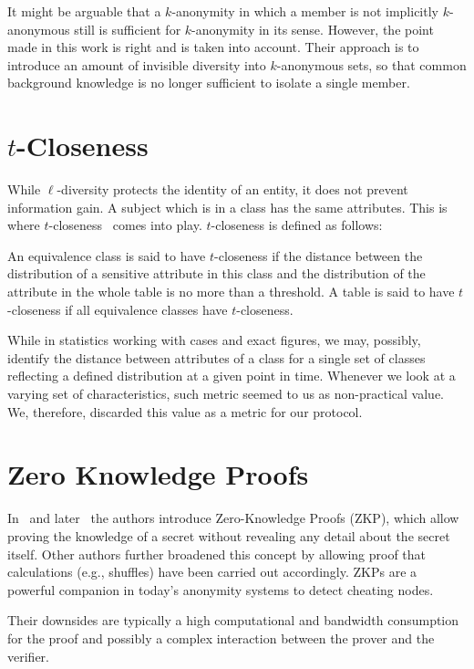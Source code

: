It might be arguable that a $k$-anonymity in which a member is not implicitly $k$-anonymous still is sufficient for $k$-anonymity in its sense. However, the point made in this work is right and is taken into account. Their approach is to introduce an amount of invisible diversity into $k$-anonymous sets, so that common background knowledge is no longer sufficient to isolate a single member.

\section{\texorpdfstring{$t$}{t}-Closeness}
While $\ell$-diversity protects the identity of an entity, it does not prevent information gain. A subject which is in a class has the same attributes. This is where $t$-closeness~\cite{li2007t} comes into play. $t$-closeness is defined as follows:

\begin{shadequote}{}
	An equivalence class is said to have $t$-closeness if the distance between the distribution of a sensitive attribute in this class and the distribution of the attribute in the whole table is no more than a threshold. A table is said to have $t$-closeness if all equivalence classes have $t$-closeness.
\end{shadequote}

While in statistics working with cases and exact figures, we may, possibly, identify the distance between attributes of a class for a single set of classes reflecting a defined distribution at a given point in time. Whenever we look at a varying set of characteristics, such metric seemed to us as non-practical value. We, therefore, discarded this value as a metric for our protocol.

\section{Zero Knowledge Proofs}
In~\cite{goldwasser1989knowledge} and later~\cite{de1987non} the authors introduce Zero-Knowledge Proofs (ZKP), which allow proving the knowledge of a secret without revealing any detail about the secret itself. Other authors further broadened this concept by allowing proof that calculations (e.g., shuffles) have been carried out accordingly. ZKPs are a powerful companion in today's anonymity systems to detect cheating nodes.

Their downsides are typically a high computational and bandwidth consumption for the proof and possibly a complex interaction between the prover and the verifier.

